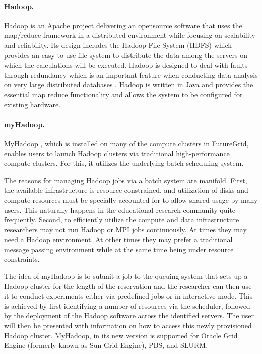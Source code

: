 \documentclass[graybox]{svmult}
\begin{document}
\paragraph{Hadoop.}\label{S:hadoop}  Hadoop \cite{www/hadoop} is an Apache project delivering an opensource software that uses the map/reduce framework in a distributed environment while focusing on scalability and reliability. Its design includes the Hadoop File System (HDFS) which provides an easy-to-use file system to distribute the data among the servers on which the calculations will be executed. Hadoop is designed to deal with faults through redundancy which is an important feature when conducting data analysis on very large distributed databases \cite{www/hadoop}.  Hadoop is written in Java and provides the essential map reduce functionality and allows the system to be configured for existing hardware.

\paragraph{myHadoop.}  MyHadoop \cite{report/myhadoop}\cite{myhadoop2}, which is installed on many of the compute clusters in FutureGrid, enables users to launch Hadoop clusters via traditional high-performance compute clusters. For this, it utilizes the underlying batch scheduling system.

The reasons for managing Hadoop jobs via a batch system are manifold. First, the available infrastructure is resource constrained, and utilization of disks and compute resources must be specially accounted for to allow shared usage by many users. This naturally happens in the educational research community quite frequently.  Second, to efficiently utilize the compute and data infrastructure researchers may not run Hadoop or MPI jobs continuously. At times they may need a Hadoop environment. At other times they may prefer a traditional message passing environment while at the same time being under resource constraints.

The idea of myHadoop is to submit a job to the queuing system that sets up a Hadoop cluster for the length of the reservation and the researcher can then use it to conduct experiments either via predefined jobs or in interactive mode. This is achieved by first identifying a number of resources via the scheduler, followed by the deployment of the Hadoop software across the identified servers. The user will then be presented with information on how to access this newly provisioned Hadoop cluster. MyHadoop, in its new version \cite{myhadoop2} is supported for Oracle Grid Engine (formerly known as Sun Grid Engine), PBS, and SLURM.
\end{document}
